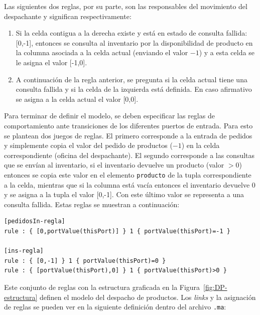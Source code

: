 \documentclass[10pt]{article}
\begin{document}
\noindent Las siguientes dos reglas, por su parte, son las responsables del movimiento del despachante y significan respectivamente:
\begin{enumerate}
	\item Si la celda contigua a la derecha existe y está en estado de consulta fallida: [0,-1], entonces se consulta al inventario por la disponibilidad de producto en la columna asociada a la celda actual (enviando el valor $-1$) y a esta celda se le asigna el valor [-1,0]. 
	\item A continuación de la regla anterior, se pregunta si la celda actual tiene una consulta fallida y si la celda de la izquierda está definida. En caso afirmativo se asigna a la celda actual el valor [0,0].
\end{enumerate}

Para terminar de definir el modelo, se deben especificar las reglas de comportamiento ante transiciones de los diferentes puertos de entrada. Para esto se plantean dos juegos de reglas. El primero corresponde a la entrada de pedidos y simplemente copia el valor del pedido de productos ($-1$) en la celda correspondiente (oficina del despachante). El segundo corresponde a las consultas que se envían al inventario, si el inventario devuelve un producto (valor $>0$) entonces se copia este valor en el elemento \texttt{producto} de la tupla correspondiente a la celda, mientras que si la columna está vacía entonces el inventario devuelve $0$ y se asigna a la tupla el valor [0,-1]. Con este último valor se representa a una consulta fallida. Estas reglas se muestran a continuación:

\begin{minipage}{1\textwidth}
	\centering
	\begin{lstlisting}
[pedidosIn-regla]
rule : { [0,portValue(thisPort)] } 1 { portValue(thisPort)=-1 }

[ins-regla]
rule : { [0,-1] } 1 { portValue(thisPort)=0 }
rule : { [portValue(thisPort),0] } 1 { portValue(thisPort)>0 }
	\end{lstlisting}
\end{minipage}

Este conjunto de reglas con la estructura graficada en la Figura~\ref{fig:DP-estructura} definen el modelo del despacho de productos. Los \textit{links} y la asignación de reglas se pueden ver en la siguiente definición dentro del archivo \texttt{.ma}:
\end{document}
